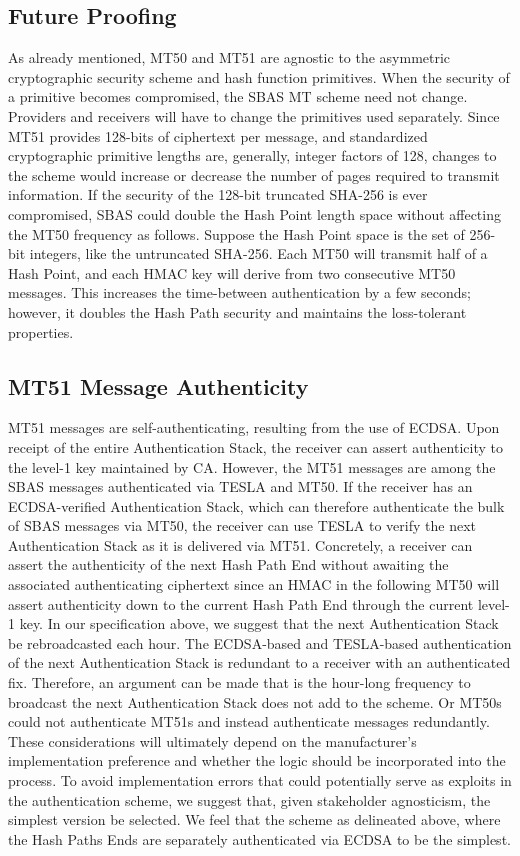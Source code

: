 \documentclass[letterpaper,times]{IONconf/IONconf}
\begin{document}
\subsection{Future Proofing}

As already mentioned, MT50 and MT51 are agnostic to the asymmetric cryptographic security scheme and hash function primitives.
When the security of a primitive becomes compromised, the SBAS MT scheme need not change.
Providers and receivers will have to change the primitives used separately.
Since MT51 provides 128-bits of ciphertext per message, and standardized cryptographic primitive lengths are, generally, integer factors of 128, changes to the scheme would increase or decrease the number of pages required to transmit information.
If the security of the 128-bit truncated SHA-256 is ever compromised, SBAS could double the Hash Point length space without affecting the MT50 frequency as follows.
Suppose the Hash Point space is the set of 256-bit integers, like the untruncated SHA-256.
Each MT50 will transmit half of a Hash Point, and each HMAC key will derive from two consecutive MT50 messages.
This increases the time-between authentication by a few seconds; however, it doubles the Hash Path security and maintains the loss-tolerant properties.

\subsection{MT51 Message Authenticity}

MT51 messages are self-authenticating, resulting from the use of ECDSA.
Upon receipt of the entire Authentication Stack, the receiver can assert authenticity to the level-1 key maintained by CA.
However, the MT51 messages are among the SBAS messages authenticated via TESLA and MT50.
If the receiver has an ECDSA-verified Authentication Stack, which can therefore authenticate the bulk of SBAS messages via MT50, the receiver can use TESLA to verify the next Authentication Stack as it is delivered via MT51.
Concretely, a receiver can assert the authenticity of the next Hash Path End without awaiting the associated authenticating ciphertext since an HMAC in the following MT50 will assert authenticity down to the current Hash Path End through the current level-1 key.
In our specification above, we suggest that the next Authentication Stack be rebroadcasted each hour.
The ECDSA-based and TESLA-based authentication of the next Authentication Stack is redundant to a receiver with an authenticated fix.
Therefore, an argument can be made that is the hour-long frequency to broadcast the next Authentication Stack does not add to the scheme.
Or MT50s could not authenticate MT51s and instead authenticate messages redundantly.
These considerations will ultimately depend on the manufacturer's implementation preference and whether the logic should be incorporated into the process.
To avoid implementation errors that could potentially serve as exploits in the authentication scheme, we suggest that, given stakeholder agnosticism, the simplest version be selected.
We feel that the scheme as delineated above, where the Hash Paths Ends are separately authenticated via ECDSA to be the simplest.
\end{document}
